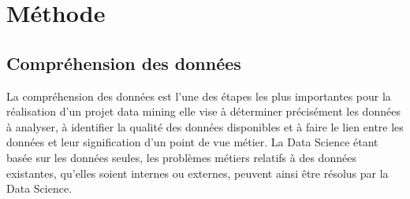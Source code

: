 \chapter{Méthode}

\section{Compréhension des données}
La compréhension des données est l’une des étapes les plus importantes pour la réalisation d’un projet data mining elle vise à déterminer précisément les données à analyser, à identifier la qualité des données disponibles et à faire le lien entre les données
et leur signification d’un point de vue métier. La Data Science étant basée sur les données seules, les problèmes métiers relatifs à des données existantes, qu’elles soient internes ou externes, peuvent ainsi être résolus par la Data Science.

